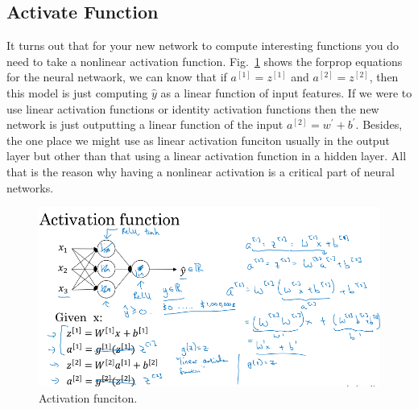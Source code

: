 \documentclass[a4paper]{article}
\begin{document}
\subsection{Activate Function}
It turns out that for your new network to compute interesting functions you do need to take a nonlinear activation function. Fig.~\ref{p14} shows the forprop equations for the neural netwaork, we can know that if $a^{[1]}=z^{[1]}$ and $a^{[2]}=z^{[2]}$, then this model is just computing $\hat{y}$ as a linear function of input features. If we were to use linear activation functions or identity activation functions then the new network is just outputting a linear function of the input $a^{[2]}=w^\prime+b^\prime$. Besides, the one place we might use as linear activation funciton usually in the output layer but other than that using a linear activation function in a hidden layer. All that is the reason why having a nonlinear activation is a critical part of neural networks.
 \begin{figure}
	\begin{center}
		\includegraphics[scale=0.3]{figures/17.png}
	\end{center}
	\caption{Activation funciton.}
	\label{p14}
\end{figure}
\end{document}

